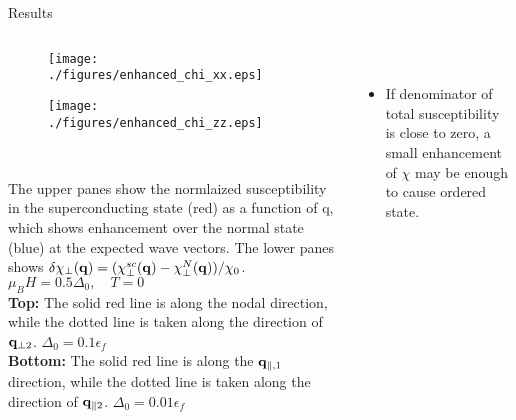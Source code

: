 \documentclass{beamer} %
\begin{document}
\begin{frame}{}
\begin{block}{\centering\veryHuge Results}
\begin{columns}[t]
			  	\begin{column}{0.5\textwidth}
			 	\begin{column}{0.6\textwidth}
					\vspace{-2cm}
					 \begin{figure}
					 \label{fig:xx_enh}
					        \centering
					                \texttt{[image: ./figures/enhanced\_chi\_xx.eps]}
					 \end{figure}
					\vspace{-2cm}
					 \begin{figure}
					 \label{fig:zz_enh}
					        \centering
					                \texttt{[image: ./figures/enhanced\_chi\_zz.eps]}
					    \end{figure}
				\end{column}
				\begin{column}{0.35\textwidth}
					\vspace{3cm}\\
			  		The upper panes show the normlaized susceptibility in the superconducting state (red) as a function of q, which shows
					                 enhancement over the normal state (blue) at the expected wave vectors. The lower panes shows $\delta\chi_\perp({\bf q}) =( \chi_\perp^{sc}({\bf q}) - \chi_\perp^{N}({\bf q}))/\chi_0$.   $\mu_B H = 0.5\Delta_0,\quad T=0$ \\
				{\bf Top:} The solid red line is along the nodal direction, while the dotted line is taken along the direction of ${\bf q}_{\perp 2}$. $\Delta_0 = 0.1\epsilon_f$\\
				{\bf Bottom:} The solid red line is along the ${\bf q}_{\parallel,1}$ direction, while the dotted line is taken along the direction of ${\bf q}_{\parallel 2}$. $\Delta_0 = 0.01\epsilon_f$
				\end{column}
				\end{column}
				
				\vrule{}
				
				\begin{column}{0.3\textwidth}\\
				\vspace{1cm}
				\begin{itemize}
				\item{
				If denominator of total susceptibility is close to zero, a small enhancement of $\chi$ may be enough to cause ordered state.
				}
				\end{itemize}
				\begin{center}
				 \end{center}
				 \begin{figure}
				


\end{figure}
\end{column}
\end{columns}
\end{block}
\end{frame}
\end{document}
